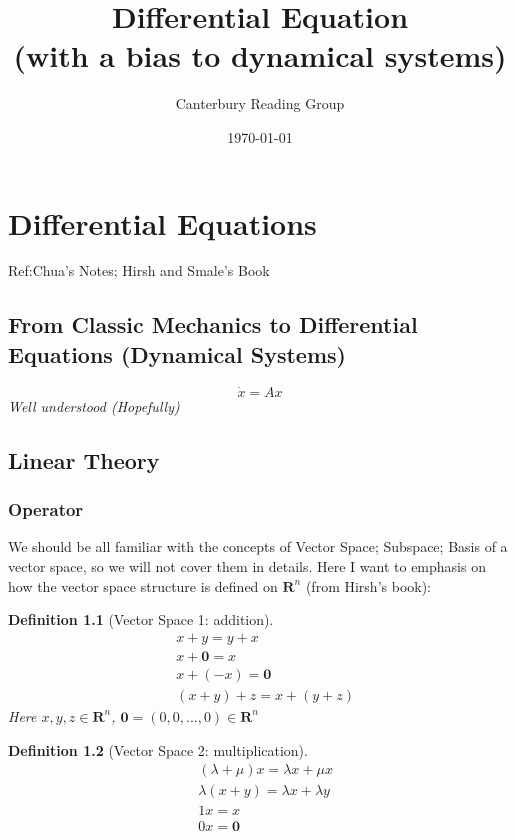 \documentclass[12pt,oneside]{book}
\newtheorem{definition}{Definition}[section]
\begin{document}
    \title{Differential Equation\\ (with a bias to dynamical systems)}\author{Canterbury Reading Group}\date{\today}\maketitle
    \tableofcontents
    \chapter{Differential Equations}
    Ref:Chua's Notes; Hirsh and Smale's Book
    \section{From Classic Mechanics to Differential Equations (Dynamical Systems)}
    \begin{equation}
    	\dot{x}=Ax
    \end{equation}
    \textit{Well understood (Hopefully)}
    \section{Linear Theory}
    
    \subsection{Operator}
    We should be all familiar with the concepts of Vector Space; Subspace; Basis of a vector space, so we will not cover them in details. 
    Here I want to emphasis on how the vector space structure is defined on $\mathbf{R}^n$ (from Hirsh's book):
    \begin{definition}[Vector Space 1: addition]
    	\begin{align*}
    		&x+y=y+x\\
    		&x+\mathbf{0}=x\\
    		&x+(-x)=\mathbf{0}\\
    		&(x+y)+z=x+(y+z)
    	\end{align*}
    Here $x,y,z\in\mathbf{R}^n$, $\mathbf{0}=(0,0,...,0)\in\mathbf{R}^n$
    \end{definition} 

	\begin{definition}[Vector Space 2: multiplication]
		\begin{align*}
			&(\lambda+\mu)x=\lambda x+\mu x\\
			&\lambda (x+y)=\lambda x+ \lambda y\\
			&1x=x\\
			&0x=\mathbf{0}
		\end{align*}
	\end{definition} 
    
\end{document}
